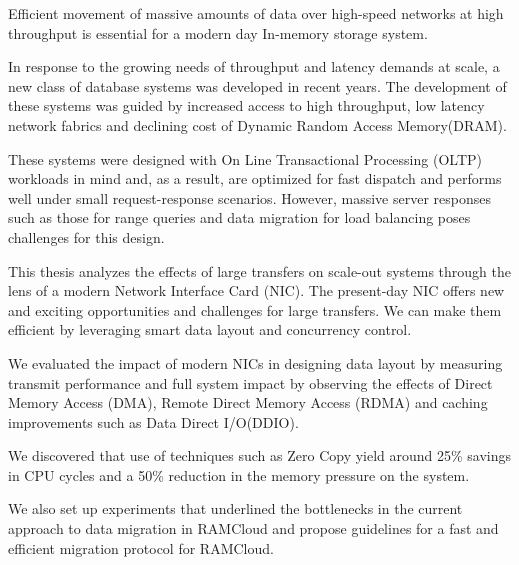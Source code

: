 


Efficient movement of massive amounts of data over high-speed networks at high 
throughput is essential for a modern day In-memory storage system.

In response to the growing needs of throughput and latency demands at scale, a new class of database systems was developed in recent years.
The development of these systems was guided by increased access to high throughput, low latency network fabrics and declining cost of Dynamic Random Access Memory(DRAM).

These systems were designed with On Line Transactional Processing (OLTP) workloads in mind and, as a result, are optimized for fast dispatch and performs well under small
request-response scenarios. However, massive server responses such as those for range queries and data migration for load balancing poses challenges for this design.  

This thesis analyzes the effects of large transfers on scale-out systems through the lens of a modern Network Interface Card (NIC).
The present-day NIC offers new and exciting opportunities and challenges for large transfers.
We can make them efficient by leveraging smart data layout and concurrency control.

We evaluated the impact of modern NICs in designing data layout by measuring transmit performance and full system impact by observing the effects of Direct Memory Access (DMA), Remote Direct Memory Access (RDMA) and caching improvements such as Data Direct I/O\textregistered (DDIO). 

We discovered that use of techniques such as Zero Copy yield around 25\% savings in CPU cycles and a 50\% reduction in the memory pressure on the system. 

We also set up experiments that underlined the bottlenecks in the current approach to data migration in RAMCloud and propose guidelines for a fast and efficient migration protocol for RAMCloud.
